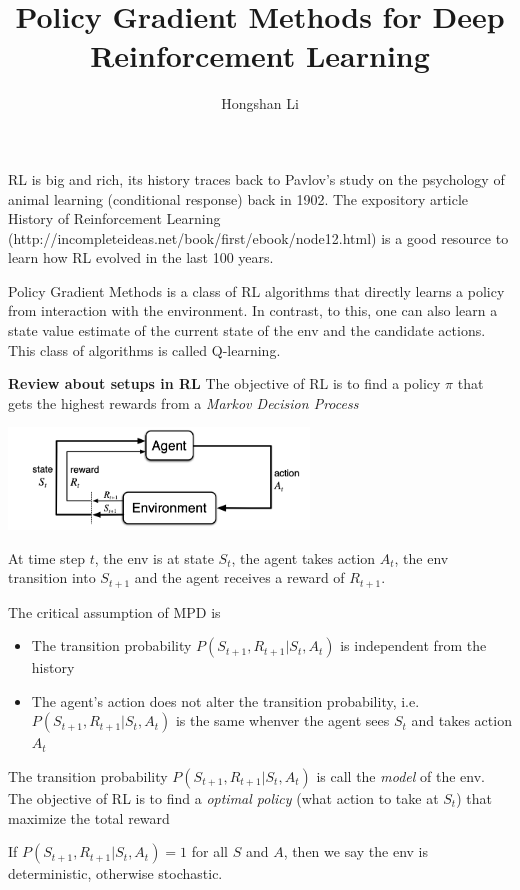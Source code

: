 \documentclass{article}
\title{Policy Gradient Methods for Deep Reinforcement Learning}
\author{Hongshan Li}
\begin{document}
\maketitle

RL is big and rich, its history traces back to Pavlov's study on the 
psychology of animal learning (conditional response) back in 1902.
The expository article History of Reinforcement Learning (http://incompleteideas.net/book/first/ebook/node12.html) is a good resource to learn
how RL evolved in the last 100 years.

Policy Gradient Methods is a class of RL algorithms that directly 
learns a policy from interaction with the environment. In contrast,
to this, one can also learn a state value estimate of the current
state of the env and the candidate actions. This class of algorithms
is called Q-learning. 


\textbf{Review about setups in RL}
The objective of RL is to find a policy $\pi$ that gets the highest 
rewards from a \emph{Markov Decision Process}

\includegraphics[width=8cm]{mdp}

At time step $t$, the env is at state $S_t$, the agent takes action 
$A_t$, the env transition into $S_{t+1}$ and the agent receives a 
reward of $R_{t+1}$. 

The critical assumption of MPD is
\begin{itemize}
    \item The transition probability $P(S_{t+1}, R_{t+1}|S_t, A_t)$ is
        independent from the history
    \item The agent's action does not alter the transition probability,
        i.e. $P(S_{t+1}, R_{t+1} | S_t, A_t)$ is the same whenver 
        the agent sees $S_t$ and takes action $A_t$
\end{itemize}

The transition probability $P(S_{t+1}, R_{t+1} | S_t, A_t)$ is call 
the \emph{model} of the env. The objective of RL is to find a
\emph{optimal policy}
(what action to take at $S_t$) that maximize the total reward

If $P(S_{t+1}, R_{t+1}|S_t, A_t) = 1$ for all $S$ and $A$, then we say
the env is deterministic, otherwise stochastic.
\end{document}
